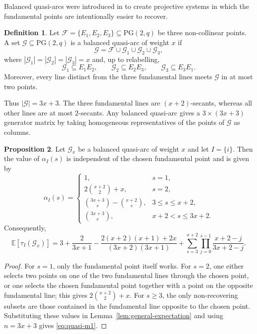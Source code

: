 \documentclass[11pt,a4paper]{article}
\numberwithin{equation}{section}
\theoremstyle{definition}
\newtheorem{definition}{Definition}[section]
\theoremstyle{definition}
\newtheorem{proposition}[definition]{Proposition}
\newcommand{\PG}{\mathrm{PG}}
\newcommand{\E}{\mathbb{E}}
\newcommand{\cG}{\mathcal{G}}
\newcommand{\cF}{\mathcal{F}}
\begin{document}
Balanced quasi-arcs were introduced in \cite{gruica2024geometry} to create projective systems in which the fundamental points are intentionally easier to recover.

\begin{definition}
Let $\cF=\{E_1,E_2,E_3\}\subseteq \PG(2,q)$ be three non-collinear points.  A set $\cG\subseteq \PG(2,q)$ is a balanced quasi-arc of weight $x$ if
\[
\cG=\cF\cup \cG_1\cup \cG_2\cup \cG_3,
\]
where $|\cG_1|=|\cG_2|=|\cG_3|=x$ and, up to relabelling,
\[
\cG_1\subseteq E_1E_2,\qquad
\cG_2\subseteq E_2E_3,\qquad
\cG_3\subseteq E_3E_1.
\]
Moreover, every line distinct from the three fundamental lines meets $\cG$ in at most two points.
\end{definition}

Thus $|\cG|=3x+3$.  The three fundamental lines are $(x+2)$-secants, whereas all other lines are at most $2$-secants.  Any balanced quasi-arc gives a $3\times (3x+3)$ generator matrix by taking homogeneous representatives of the points of $\cG$ as columns.

\begin{proposition}\label{prop:quasi-alpha-single}
Let $\cG_x$ be a balanced quasi-arc of weight $x$ and let $I=\{i\}$.  Then the value of $\alpha_I(s)$ is independent of the chosen fundamental point and is given by
\[
\alpha_I(s)=
\begin{cases}
1, & s=1,\\[1mm]
2\binom{x+2}{2}+x, & s=2,\\[1mm]
\binom{3x+3}{s}-\binom{x+2}{s}, & 3\le s\le x+2,\\[1mm]
\binom{3x+3}{s}, & x+2<s\le 3x+2.
\end{cases}
\]
Consequently,
\begin{equation}\label{eq:quasi-m1}
\E[\tau_I(\cG_x)]
=3+\frac{2}{3x+1}
-\frac{2(x+2)(x+1)+2x}{(3x+2)(3x+1)}
+\sum_{s=3}^{x+2}\prod_{j=0}^{s-1}\frac{x+2-j}{3x+2-j}.
\end{equation}
\end{proposition}

\begin{proof}
For $s=1$, only the fundamental point itself works.  For $s=2$, one either selects two points on one of the two fundamental lines through the chosen point, or one selects the chosen fundamental point together with a point on the opposite fundamental line; this gives $2\binom{x+2}{2}+x$.  For $s\ge 3$, the only non-recovering subsets are those contained in the fundamental line opposite to the chosen point.  Substituting these values in Lemma~\ref{lem:general-expectation} and using $n=3x+3$ gives \eqref{eq:quasi-m1}.
\end{proof}
\end{document}
